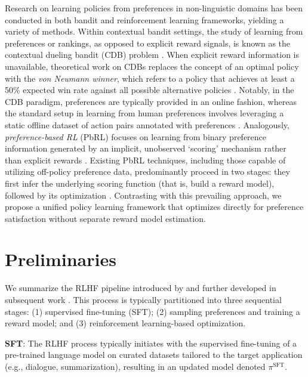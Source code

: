 Research on learning policies from preferences in non-linguistic domains has been conducted in both bandit and reinforcement learning frameworks, yielding a variety of methods. Within contextual bandit settings, the study of learning from preferences or rankings, as opposed to explicit reward signals, is known as the contextual dueling bandit (CDB) problem \citep{yue2012karmed, dudik2015contextual}. When explicit reward information is unavailable, theoretical work on CDBs replaces the concept of an optimal policy with the \textit{von Neumann winner}, which refers to a policy that achieves at least a 50\% expected win rate against all possible alternative policies \citep{dudik2015contextual}. Notably, in the CDB paradigm, preferences are typically provided in an online fashion, whereas the standard setup in learning from human preferences involves leveraging a static offline dataset of action pairs annotated with preferences \citep{yan2022human}. Analogously, \textit{preference-based RL} (PbRL) focuses on learning from binary preference information generated by an implicit, unobserved ‘scoring’ mechanism rather than explicit rewards \citep{BusaFekete2014, ruiz2023dueling}. Existing PbRL techniques, including those capable of utilizing off-policy preference data, predominantly proceed in two stages: they first infer the underlying scoring function (that is, build a reward model), followed by its optimization \citep{jain2013learning, BusaFekete2014, christiano2017deep, sadigh2017active, kupcsik2018learning}. Contrasting with this prevailing approach, we propose a unified policy learning framework that optimizes directly for preference satisfaction without separate reward model estimation.

\section{Preliminaries}\label{section:prelims}

We summarize the RLHF pipeline introduced by \citeauthor{ziegler2020finetuning} and further developed in subsequent work \citep{stiennon2022learning, bai2022training, ouyang2022training}. This process is typically partitioned into three sequential stages: (1) supervised fine-tuning (SFT); (2) sampling preferences and training a reward model; and (3) reinforcement learning-based optimization.

\textbf{SFT}: The RLHF process typically initiates with the supervised fine-tuning of a pre-trained language model on curated datasets tailored to the target application (e.g., dialogue, summarization), resulting in an updated model denoted $\pi^\text{SFT}$.

